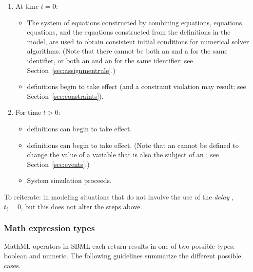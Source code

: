 \begin{enumerate}
\item At time $t = 0$:
  \begin{itemize}  
    
  \item The system of equations constructed by combining
    \AssignmentRule equations, \AlgebraicRule equations, \RateRule
    equations, and the equations constructed from the \Reaction
    definitions in the model, are used to obtain consistent
    initial conditions for numerical solver algorithms.  (Note
    that there cannot be both an \AssignmentRule and a \RateRule
    for the same identifier, or both an \AssignmentRule and an
    \InitialAssignment for the same identifier; see
    Section~\ref{sec:assignmentrule}.)
    
  \item \Constraint definitions begin to take effect (and a
    constraint violation may result; see
    Section~\ref{sec:constraints}).

  \end{itemize}
  
\item For time $t > 0$:
  \begin{itemize}
    
  \item \RateRule definitions can begin to take effect.
    
  \item \Event definitions can begin to take effect.  (Note that
    an \Event cannot be defined to change the value of a variable
    that is also the subject of an \AssignmentRule; see
    Section~\ref{sec:events}.)

  \item System simulation proceeds.

  \end{itemize}

\end{enumerate}  

To reiterate: in modeling situations that do not involve the use
of the \emph{delay} , $t_i = 0$, but this does not
alter the steps above.


\subsubsection{Math expression types}
\label{sec:mathmltype}

MathML operators in SBML each return results in one of two
possible types: boolean and numeric.  The following guidelines
summarize the different possible cases.

